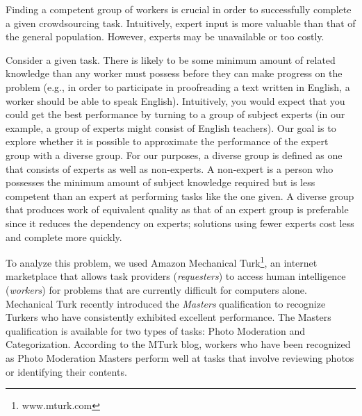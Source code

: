 \documentclass{chi2012}
\newcommand{\tab}{\hspace*{2em}}
\begin{document}



Finding a competent group of workers is crucial in order to successfully complete a given crowdsourcing task.  Intuitively, expert input is more valuable than that of the general population.  However, experts may be unavailable or too costly.  

Consider a given task.  There is likely to be some minimum amount of related knowledge than any worker must possess before they can make progress on the problem (e.g., in order to participate in proofreading a text written in English, a worker should be able to speak English).  Intuitively, you would expect that you could get the best performance by turning to a group of subject experts (in our example, a group of experts might consist of English teachers).  Our goal is to explore whether it is possible to approximate the performance of the expert group with a diverse group.  For our purposes, a diverse group is defined as one that consists of experts as well as non-experts.  A non-expert is a person who possesses the minimum amount of subject knowledge required but is less competent than an expert at performing tasks like the one given.  A diverse group that produces work of equivalent quality as that of an expert group is preferable since it reduces the dependency on experts; solutions using fewer experts cost less and complete more quickly.

To analyze this problem, we used Amazon Mechanical Turk\footnote{www.mturk.com}, an internet marketplace that allows task providers (\textit{requesters}) to access human intelligence (\textit{workers}) for problems that are currently difficult for computers alone.
Mechanical Turk recently introduced the \textit{Masters} qualification to recognize Turkers who have consistently exhibited excellent performance.
The Masters qualification is available for two types of tasks: Photo Moderation and Categorization.  
According to the MTurk blog, workers who have been recognized as Photo Moderation Masters perform well at tasks that involve reviewing photos or identifying their contents.  %
\end{document}
